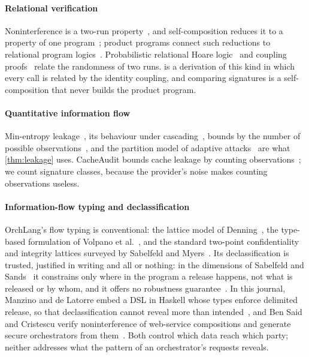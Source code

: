 \paragraph{Relational verification} Noninterference is a two-run
property~\cite{goguen1982security}, and self-composition reduces it to a property of one
program~\cite{Barthe2004SelfComposition,Terauchi2005Safety}; product programs connect
such reductions to relational program logics~\cite{Barthe2016ProductPrograms}.
Probabilistic relational Hoare logic~\cite{barthe2009formal} and coupling
proofs~\cite{barthe2017coupling} relate the randomness of two runs.  is a
derivation of this kind in which every call is related by the identity coupling, and
comparing signatures is a self-composition that never builds the product program.

\paragraph{Quantitative information flow} Min-entropy leakage~\cite{smith2009foundations},
its behaviour under cascading~\cite{espinoza2012min}, bounds by the number of possible
observations~\cite{kopf2010vulnerability,doychev2013cacheaudit}, and the partition model
of adaptive attacks~\cite{kopf2007information} are what \cref{thm:leakage} uses.
CacheAudit bounds cache leakage by counting observations~\cite{doychev2013cacheaudit}; we
count signature classes, because the provider's noise makes counting observations
useless.

\paragraph{Information-flow typing and declassification} OrchLang's flow typing is
conventional: the lattice model of Denning~\cite{denning1976lattice}, the type-based
formulation of Volpano et al.~\cite{volpano1996sound}, and the standard two-point
confidentiality and integrity lattices surveyed by Sabelfeld and
Myers~\cite{sabelfeld2003language}. Its declassification is trusted, justified in writing
and all or nothing: in the dimensions of Sabelfeld and Sands~\cite{SabelfeldSands2009} it
constrains only where in the program a release happens, not what is released or by
whom, and it offers no robustness guarantee~\cite{Myers2006Robust}. In this
journal, Manzino and de Latorre embed a DSL in Haskell whose types enforce delimited
release, so that declassification cannot reveal more than
intended~\cite{manzino2026haskell}, and Ben Said and Cristescu verify noninterference of
web-service compositions and generate secure orchestrators from
them~\cite{BenSaid2020Orchestration}. Both control which data reach which party; neither
addresses what the pattern of an orchestrator's requests reveals.

